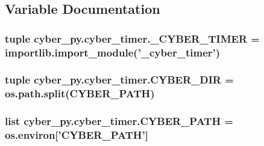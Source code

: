 \subsection{Variable Documentation}
\hypertarget{namespacecyber__py_1_1cyber__timer_a8b9d6437312c58af55c4daa4e1474bfe}{
\subsubsection[{\-\_\-\-C\-Y\-B\-E\-R\-\_\-\-T\-I\-M\-E\-R}]{\setlength{\rightskip}{0pt plus 5cm}tuple cyber\-\_\-py.\-cyber\-\_\-timer.\-\_\-\-C\-Y\-B\-E\-R\-\_\-\-T\-I\-M\-E\-R = importlib.\-import\-\_\-module('\-\_\-cyber\-\_\-timer')}}\label{namespacecyber__py_1_1cyber__timer_a8b9d6437312c58af55c4daa4e1474bfe}
\hypertarget{namespacecyber__py_1_1cyber__timer_a3430bd073705122f7f88b5db7d369fac}{
\subsubsection[{C\-Y\-B\-E\-R\-\_\-\-D\-I\-R}]{\setlength{\rightskip}{0pt plus 5cm}tuple cyber\-\_\-py.\-cyber\-\_\-timer.\-C\-Y\-B\-E\-R\-\_\-\-D\-I\-R = os.\-path.\-split({\bf C\-Y\-B\-E\-R\-\_\-\-P\-A\-T\-H})}}\label{namespacecyber__py_1_1cyber__timer_a3430bd073705122f7f88b5db7d369fac}
\hypertarget{namespacecyber__py_1_1cyber__timer_a9124b960c5d5e162ed68a7d1bdc96982}{
\subsubsection[{C\-Y\-B\-E\-R\-\_\-\-P\-A\-T\-H}]{\setlength{\rightskip}{0pt plus 5cm}list cyber\-\_\-py.\-cyber\-\_\-timer.\-C\-Y\-B\-E\-R\-\_\-\-P\-A\-T\-H = os.\-environ\mbox{[}'C\-Y\-B\-E\-R\-\_\-\-P\-A\-T\-H'\mbox{]}}}\label{namespacecyber__py_1_1cyber__timer_a9124b960c5d5e162ed68a7d1bdc96982}
